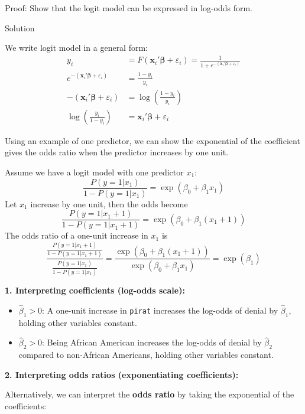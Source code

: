 \documentclass[
  12pt,
  a4paper,
]{scrbook}
\providecommand{\tightlist}{%
  \setlength{\itemsep}{0pt}\setlength{\parskip}{0pt}}
\renewcommand{\tightlist}{\setlength{\itemsep}{0.5\baselineskip}\setlength{\parskip}{0.2\baselineskip}}
\newcommand{\bx}{\boldsymbol{x}}
\newcommand{\bbeta}{\boldsymbol{\beta}}
\theoremstyle{plain}
\theoremstyle{definition}
\theoremstyle{remark}
\begin{document}
Proof: Show that the logit model can be expressed in log-odds form.

Solution

\protect{}\label{proof-1}
We write logit model in a general form: \[
\begin{split}
y_i &= F(\bx_i'\bbeta + \varepsilon_i) = \frac{1}{1 + e^{-(\bx_i'\bbeta + \varepsilon_i)}} \\
e^{-(\bx_i'\bbeta + \varepsilon_i)} &= \frac{1 - y_i}{y_i} \\
-(\bx_i'\bbeta + \varepsilon_i) &= \log\left(\frac{1 - y_i}{y_i}\right) \\
\log\left(\frac{y_i}{1 - y_i}\right) &= \bx_i'\bbeta + \varepsilon_i
\end{split}
\]

Using an example of one predictor, we can show the exponential of the
coefficient gives the odds ratio when the predictor increases by one
unit.

Assume we have a logit model with one predictor \(x_1\): \[
\frac{P(y=1|x_1)}{1 - P(y=1|x_1)} = \exp\left(\beta_0 + \beta_1 x_1\right)
\] Let \(x_1\) increase by one unit, then the odds become \[
\frac{P(y=1|x_1 + 1)}{1 - P(y=1|x_1 + 1)} = \exp\left(\beta_0 + \beta_1 (x_1 + 1)\right)
\] The odds ratio of a one-unit increase in \(x_1\) is \[
\frac{\frac{P(y=1|x_1 + 1)}{1 - P(y=1|x_1 + 1)}}{\frac{P(y=1|x_1)}{1 - P(y=1|x_1)}} = \frac{\exp\left(\beta_0 + \beta_1 (x_1 + 1        )\right)}{\exp\left(\beta_0 + \beta_1 x_1\right)} = \exp(\beta_1)
\]

\textbf{1. Interpreting coefficients (log-odds scale):}

\begin{itemize}
\tightlist
\item
  \(\hat{\beta}_1 > 0\): A one-unit increase in \texttt{pirat} increases
  the log-odds of denial by \(\hat{\beta}_1\), holding other variables
  constant.
\item
  \(\hat{\beta}_2 > 0\): Being African American increases the log-odds
  of denial by \(\hat{\beta}_2\) compared to non-African Americans,
  holding other variables constant.
\end{itemize}

\textbf{2. Interpreting odds ratios (exponentiating coefficients):}

Alternatively, we can interpret the \textbf{odds ratio} by taking the
exponential of the coefficients:
\end{document}

